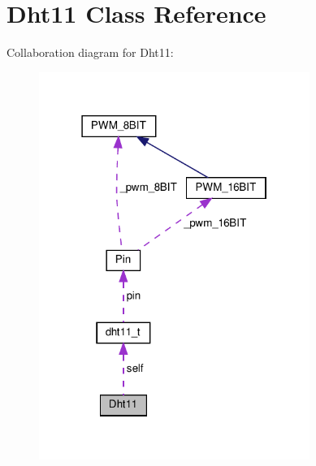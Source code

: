 \hypertarget{classDht11}{}\section{Dht11 Class Reference}
\label{classDht11}


Collaboration diagram for Dht11\+:\nopagebreak
\begin{figure}[H]
\begin{center}
\leavevmode
\includegraphics[width=250pt]{classDht11__coll__graph}
\end{center}
\end{figure}
